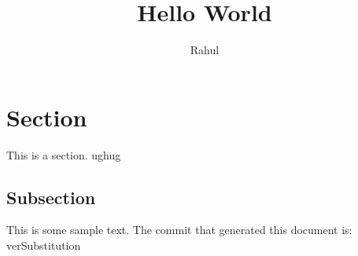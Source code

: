\documentclass[12pt]{article}
\title{Hello World}
\author{Rahul}
\begin{document}
\maketitle

\section{Section}

This is a section. ughug

\subsection{Subsection}

This is some sample text.
The commit that generated this document is: verSubstitution
\end{document}

